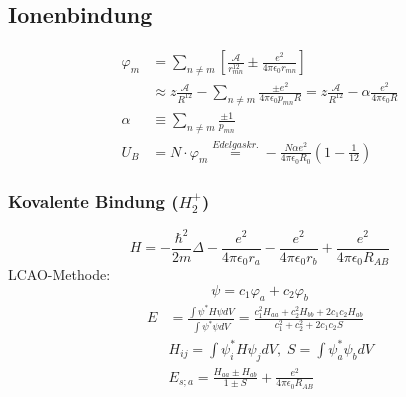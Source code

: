 \subsection*{Ionenbindung}
\begin{equation*}
    \begin{aligned}
        \varphi_m &= \sum_{n \neq m} \left[\frac{\mathcal{A}}{r_{mn}^{12}} \pm \frac{e^2}{4 \pi \epsilon_0 r_{mn}}\right] \\
            &\approx z \frac{\mathcal{A}}{R^{12}} - \sum_{n \neq m} \frac{\pm e^2}{4 \pi \epsilon_0 p_{mn}R} = z  \frac{\mathcal{A}}{R^{12}} - \alpha \frac{e^2}{4 \pi \epsilon_0 R} \\
        \alpha & \equiv \sum_{n \neq m} \frac{\pm 1}{p_{mn}} \\
        U_B &= N \cdot \varphi_m \overset{Edelgaskr.}{=} - \frac{N \alpha e^2}{4 \pi \epsilon_0 R_0} \left(1- \frac{1}{12}\right)
    \end{aligned}
\end{equation*}

\subsubsection*{Kovalente Bindung ($H_2^+$)}
\begin{equation*}
    H = -\frac{\hbar^2}{2m} \Delta - \frac{e^2}{4 \pi \epsilon_0 r_a} - \frac{e^2}{4 \pi \epsilon_0 r_b} +\frac{e^2}{4 \pi \epsilon_0 R_{AB}}
\end{equation*}
LCAO-Methode:
\begin{equation*}
    \psi = c_1\varphi_a + c_2 \varphi_b
\end{equation*}
\begin{equation*}
    \begin{aligned}
        E &= \frac{\int \psi^* H \psi dV}{\int \psi^* \psi dV} = \frac{c_1^2H_{aa}+c_2^2H_{bb}+2c_1c_2H_{ab}}{c_1^2+c_2^2+2c_1c_2S} \\
        &H_{ij} = \int \psi_i^* H \psi_j dV , \; S= \int \psi_a^* \psi_b dV \\
        &E_{s;a} = \frac{H_{aa} \pm H_{ab}}{1 \pm S} + \frac{e^2}{4 \pi \epsilon_0 R_{AB}}
    \end{aligned}
\end{equation*}

